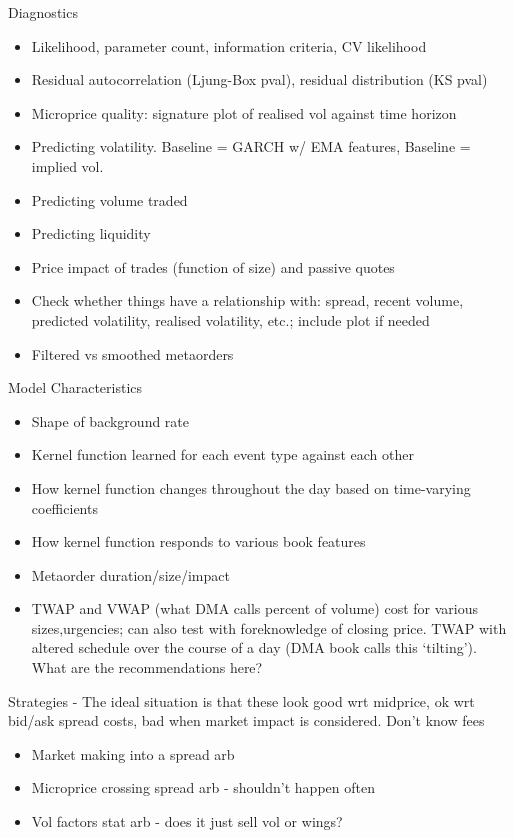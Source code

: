 \documentclass[honours,12pt]{unswthesis}
\numberwithin{equation}{section}
\begin{document}
Diagnostics
\begin{itemize}
	\item Likelihood, parameter count, information criteria, CV likelihood
	\item Residual autocorrelation (Ljung-Box pval), residual distribution (KS pval)
	\item Microprice quality: signature plot of realised vol against time horizon
	\item Predicting volatility. Baseline = GARCH w/ EMA features, Baseline = implied vol.
	\item Predicting volume traded
	\item Predicting liquidity
	\item Price impact of trades (function of size) and passive quotes
	\item Check whether things have a relationship with: spread, recent volume, predicted volatility, realised volatility, etc.; include plot if needed
	\item Filtered vs smoothed metaorders
\end{itemize}

Model Characteristics
\begin{itemize}
	\item Shape of background rate
	\item Kernel function learned for each event type against each other
	\item How kernel function changes throughout the day based on time-varying coefficients
	\item How kernel function responds to various book features
	\item Metaorder duration/size/impact
	\item TWAP and VWAP (what DMA calls percent of volume) cost for various sizes,urgencies; can also test with foreknowledge of closing price. TWAP with altered schedule over the course of a day (DMA book calls this `tilting'). What are the recommendations here?
\end{itemize}

Strategies - The ideal situation is that these look good wrt midprice, ok wrt bid/ask spread costs, bad when market impact is considered. Don't know fees
\begin{itemize}
	\item Market making into a spread arb
	\item Microprice crossing spread arb - shouldn't happen often
	\item Vol factors stat arb - does it just sell vol or wings?
\end{itemize}
\end{document}
